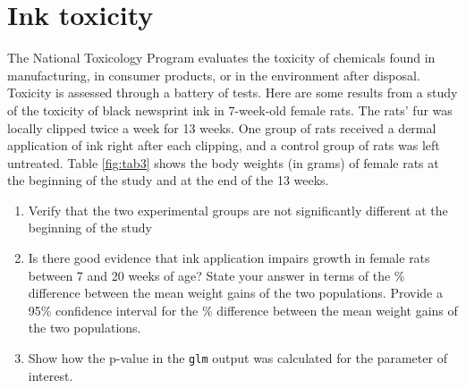 \documentclass[letterpaper,9pt,twoside,printwatermark=false]{pinp}
\providecommand{\tightlist}{%
  \setlength{\itemsep}{0pt}\setlength{\parskip}{0pt}}
\begin{document}
\clearpage

\section{Ink toxicity}\label{ink-toxicity}

The National Toxicology Program evaluates the toxicity of chemicals
found in manufacturing, in consumer products, or in the environment
after disposal. Toxicity is assessed through a battery of tests. Here
are some results from a study of the toxicity of black newsprint ink in
7-week-old female rats. The rats' fur was locally clipped twice a week
for 13 weeks. One group of rats received a dermal application of ink
right after each clipping, and a control group of rats was left
untreated. Table \ref{fig:tab3} shows the body weights (in grams) of
female rats at the beginning of the study and at the end of the 13
weeks.

\begin{enumerate}
\def\labelenumi{\alph{enumi}.}
\tightlist
\item
  Verify that the two experimental groups are not significantly
  different at the beginning of the study
\item
  Is there good evidence that ink application impairs growth in female
  rats between 7 and 20 weeks of age? State your answer in terms of the
  \% difference between the mean weight gains of the two populations.
  Provide a 95\% confidence interval for the \% difference between the
  mean weight gains of the two populations.
\item
  Show how the p-value in the \texttt{glm} output was calculated for the
  parameter of interest.
\end{enumerate}
\end{document}
